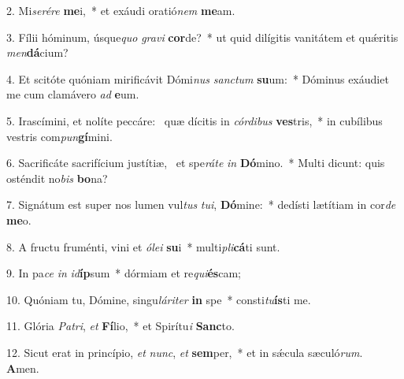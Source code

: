 2. Mi\textit{se}\textit{ré}\textit{re} \textbf{me}i,~*  et exáudi oratió\textit{nem} \textbf{me}am.\

3. Fílii hóminum, úsque\textit{quo} \textit{gra}\textit{vi} \textbf{cor}de?~*  ut quid dilígitis vanitátem et quǽritis \textit{men}\textbf{dá}cium?\

4. Et scitóte quóniam mirificávit Dómi\textit{nus} \textit{sanc}\textit{tum} \textbf{su}um:~*  Dóminus exáudiet me cum clamávero \textit{ad} \textbf{e}um.\

5. Irascímini, et nolíte peccáre: \dag\  quæ dícitis in \textit{cór}\textit{di}\textit{bus} \textbf{ves}tris,~*  in cubílibus vestris com\textit{pun}\textbf{gí}mini.\

6. Sacrificáte sacrifícium justítiæ, \dag\  et spe\textit{rá}\textit{te} \textit{in} \textbf{Dó}mino.~*  Multi dicunt: quis osténdit no\textit{bis} \textbf{bo}na?\

7. Signátum est super nos lumen vul\textit{tus} \textit{tu}\textit{i}, \textbf{Dó}mine:~*  dedísti lætítiam in cor\textit{de} \textbf{me}o.\

8. A fructu fruménti, vini et \textit{ó}\textit{le}\textit{i} \textbf{su}i~*  multi\textit{pli}\textbf{cá}ti sunt.\

9. In pa\textit{ce} \textit{in} \textit{id}\textbf{íp}sum~*  dórmiam et re\textit{qui}\textbf{és}cam;\

10. Quóniam tu, Dómine, singu\textit{lá}\textit{ri}\textit{ter} \textbf{in} spe~*  consti\textit{tu}\textbf{ís}ti me.\

11. Glória \textit{Pa}\textit{tri}, \textit{et} \textbf{Fí}lio,~*  et Spirítu\textit{i} \textbf{Sanc}to.\

12. Sicut erat in princípio, \textit{et} \textit{nunc}, \textit{et} \textbf{sem}per,~*  et in sǽcula sæculó\textit{rum}. \textbf{A}men.\

